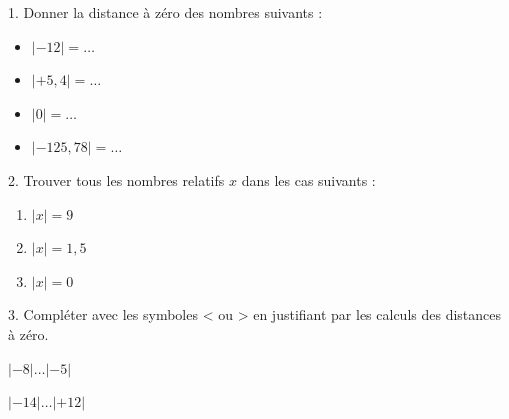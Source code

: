\documentclass[a4paper]{book}
\begin{document}
    
    \begin{exemple} 
        \begin{minipage}{0.5\linewidth}
            1. Donner la distance à zéro des nombres suivants :
            \begin{itemize}
                \item $ |-12| = \dots$
    
                \medskip
                
                \item $ |+5,4| = \dots$
                
                \medskip
                
                \item $ |0| = \dots$
                
                \medskip
                
                \item $ |-125,78| = \dots$
                
                \medskip
            \end{itemize}
        \end{minipage}
        \hfill
        \begin{minipage}{0.49\linewidth}
            2. Trouver tous les nombres relatifs $x$ dans les cas suivants :
            \begin{enumerate}
                \item $|x| = 9$

                \bigskip
                
                \item $|x| = 1,5$

                \bigskip
                
                \item $|x| = 0$

                \medskip
            \end{enumerate}
        \end{minipage}

        3. Compléter avec les symboles < ou > en justifiant par les calculs des distances à zéro.

        \medskip
        
        \begin{minipage}{0.24\linewidth}
            $|-8| \ldots |-5|$

            \vspace{2cm}
        \end{minipage}
        \hfill\vline\hfill
        \begin{minipage}{0.24\linewidth}
            $|-14| \ldots |+12|$


\end{minipage}
\end{exemple}
\end{document}
